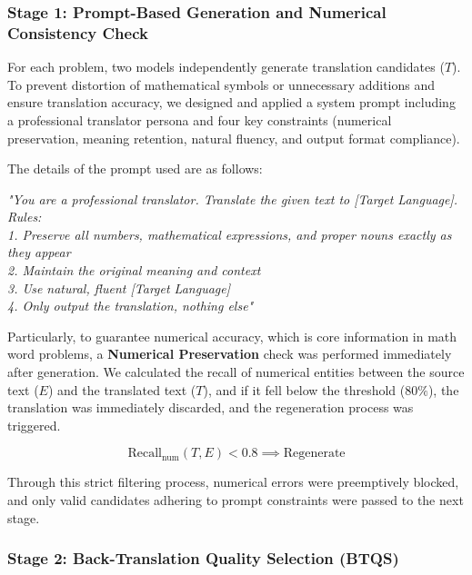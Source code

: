 \subsubsection{Stage 1: Prompt-Based Generation and Numerical Consistency Check}
\label{sec:pre-filtering}

For each problem, two models independently generate translation candidates ($T$). To prevent distortion of mathematical symbols or unnecessary additions and ensure translation accuracy, we designed and applied a system prompt including a professional translator persona and four key constraints (numerical preservation, meaning retention, natural fluency, and output format compliance).

The details of the prompt used are as follows:

\begin{tcolorbox}[ colback=gray!5, colframe=black, boxrule=0.6pt, arc=6pt, left=8pt, right=8pt, top=6pt, bottom=6pt, title=Translation System Prompt ] 
\small
\textit{ "You are a professional translator. Translate the given text to [Target Language]. \\ Rules: \\ 1. Preserve all numbers, mathematical expressions, and proper nouns exactly as they appear \\ 2. Maintain the original meaning and context \\ 3. Use natural, fluent [Target Language] \\ 4. Only output the translation, nothing else" } 
\end{tcolorbox}

Particularly, to guarantee numerical accuracy, which is core information in math word problems, a \textbf{Numerical Preservation} check was performed immediately after generation. We calculated the recall of numerical entities between the source text ($E$) and the translated text ($T$), and if it fell below the threshold ($80\%$), the translation was immediately discarded, and the regeneration process was triggered.

\begin{equation}
    \text{Recall}_{\text{num}}(T, E) < 0.8 \implies \text{Regenerate}
\end{equation}

Through this strict filtering process, numerical errors were preemptively blocked, and only valid candidates adhering to prompt constraints were passed to the next stage.

\subsubsection{Stage 2: Back-Translation Quality Selection (BTQS)}

